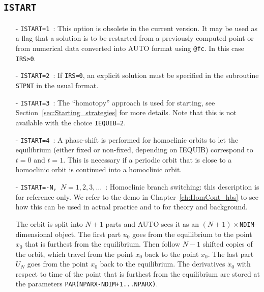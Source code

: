 \documentclass[12pt]{report}
\begin{document}
\subsection{\tt ISTART}  \label{sec:ISTART}
\begin{itemize}
\item[-] {\tt ISTART=1}~:  
This option is obsolete in the current version. 
It may be used as a flag that a solution is to be
restarted from a previously computed point or
from numerical data converted into {\cal AUTO} format using {\tt @fc}.
In this case {\tt IRS>0}.
\item[-] {\tt ISTART=2}~: 
If {\tt IRS=0}, an explicit solution must be specified in the
subroutine {\tt STPNT} in the usual format. 
\item[-] {\tt ISTART=3}~: 
The ``homotopy'' approach is used for starting, see 
Section~\ref{sec:Starting_strategies} 
for more details. Note that this is not available with the choice 
{\tt IEQUIB=2}.
\item[-] {\tt ISTART=4}~:
A phase-shift is performed for homoclinic orbits to let the
equilibrium (either fixed or non-fixed, depending on IEQUIB)
correspond to $t=0$ and $t=1$. This is necessary if a periodic
orbit that is close to a homoclinic orbit is continued into
a homoclinic orbit.
\item[-] {\tt ISTART=-N, $N=1,2,3,\ldots$}~:
Homoclinic branch switching: this description is for reference only.
We refer to the demo in Chapter~\ref{ch:HomCont_hbs} to see how this
can be used in actual practice and to  for
theory and background.

The orbit is split into $N+1$ parts and
{\cal AUTO} sees it as an $(N+1)\times${\tt NDIM}-dimensional object.
The first part $u_0$ goes from the equilibrium to the point $x_0$ that is 
furthest from the equilibrium. 
Then follow $N-1$ shifted copies of the orbit, which travel
from the point $x_0$ back to the point $x_0$. The last part $U_N$
goes from the point $x_0$ back to the equilibrium. 
The derivatives $\dot{x}_0$ with respect to time
of the point that is furthest from the equilibrium are stored at the 
parameters {\tt PAR(NPARX-NDIM+1...NPARX)}.


\end{itemize}
\end{document}
